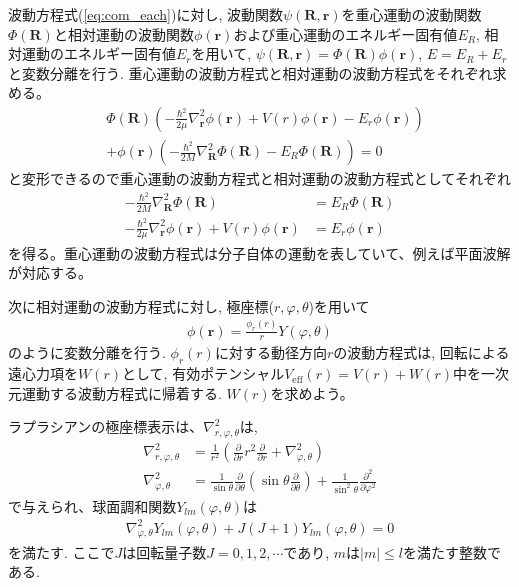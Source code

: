 波動方程式(\ref{eq:com_each})に対し, 波動関数$\psi(\boldsymbol{R},\boldsymbol{r})$を重心運動の波動関数$\Phi(\boldsymbol{R})$と相対運動の波動関数$\phi(\boldsymbol{r})$および重心運動のエネルギー固有値$E_R$, 相対運動のエネルギー固有値$E_r$を用いて, $\psi(\boldsymbol{R},\boldsymbol{r}) = \Phi(\boldsymbol{R})\phi(\boldsymbol{r})$, $E = E_R + E_r$と変数分離を行う. 重心運動の波動方程式と相対運動の波動方程式をそれぞれ求める。
\begin{align}
  &\Phi(\boldsymbol{R}) \left( - \frac{\hbar^2}{2 \mu} \nabla_{\boldsymbol{r}}^2 \phi(\boldsymbol{r})  + V(r) \phi(\boldsymbol{r}) - E_r \phi(\boldsymbol{r})  \right) \nonumber \\
  &+ \phi(\boldsymbol{r}) \left(  - \frac{\hbar^2}{2 M} \nabla_{\boldsymbol{R}}^2 \Phi(\boldsymbol{R}) - E_R \Phi(\boldsymbol{R}) \right) = 0
\end{align}
と変形できるので重心運動の波動方程式と相対運動の波動方程式としてそれぞれ
\begin{align}
 - \frac{\hbar^2}{2 M} \nabla_{\boldsymbol{R}}^2 \Phi(\boldsymbol{R}) &= E_R \Phi(\boldsymbol{R}) \\
- \frac{\hbar^2}{2 \mu} \nabla_{\boldsymbol{r}}^2 \phi(\boldsymbol{r})  + V(r) \phi(\boldsymbol{r}) &= E_r \phi(\boldsymbol{r}) 
\end{align}
を得る。重心運動の波動方程式は分子自体の運動を表していて、例えば平面波解が対応する。

次に相対運動の波動方程式に対し, 極座標($r, \varphi, \theta$)を用いて
  \begin{eqnarray}
    \label{eq:rotvib}
    \phi(\boldsymbol{r}) = \frac{\phi_r(r)}{r} Y(\varphi, \theta)
  \end{eqnarray}
  のように変数分離を行う. $\phi_r(r)$に対する動径方向$r$の波動方程式は, 回転による遠心力項を$W(r)$として,  有効ポテンシャル$V_\mathrm{eff} (r) = V(r) + W(r)$中を一次元運動する波動方程式に帰着する. $W(r)$を求めよう。

ラプラシアンの極座標表示は、$\nabla^2_{r, \varphi, \theta}$は, 
  \begin{align}
    \nabla^2_{r, \varphi, \theta} &= \frac{1}{r^2} \left( \frac{\partial}{\partial r} r^2 \frac{\partial}{\partial r} + \nabla^2_{\varphi, \theta} \right) \\
          \nabla^2_{\varphi, \theta} &= \frac{1}{\sin{\theta}}\frac{\partial}{\partial \theta}
        \left( \sin{\theta} \frac{\partial}{\partial \theta} \right)
        + \frac{1}{\sin^2 \theta} \frac{\partial^2}{\partial \varphi^2}
\end{align}
で与えられ、球面調和関数$Y_{lm} (\varphi, \theta)$は  
      \begin{eqnarray}
        \nabla^2_{\varphi, \theta} Y_{lm}(\varphi, \theta) + J(J+1) Y_{lm}(\varphi, \theta) = 0 
      \end{eqnarray}
を満たす. ここで$J$は回転量子数$J=0, 1, 2, \cdots$であり, $m$は$|m| \le l$を満たす整数である. 


